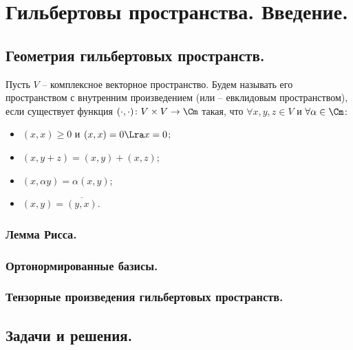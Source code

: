 \part{Гильбертовы пространства. Введение.}
\chapter{Геометрия гильбертовых пространств.}
\begin{definition}
    Пусть $V$ -- комплексное векторное пространство.
    Будем называть его пространством с внутренним произведением (или -- евклидовым пространством), если существует функция $(\cdot, \cdot)\colon V \times V \to \Cm$ такая, что $\forall x, y, z \in V$ и $\forall \alpha \in \Cm\colon$
    \begin{itemize}
        \item $(x, x) \geq 0$ и $(x, x) = 0 \Lra x = 0$;
        \item $(x, y + z) = (x, y) + (x, z)$;
        \item $(x, \alpha y) = \alpha(x, y)$;
        \item $(x, y) = \overline{(y, x)}$.
    \end{itemize}
\end{definition}
\section{Лемма Рисса.}
\section{Ортонормированные базисы.}
\section{Тензорные произведения гильбертовых пространств.}
\chapter{Задачи и решения.}
